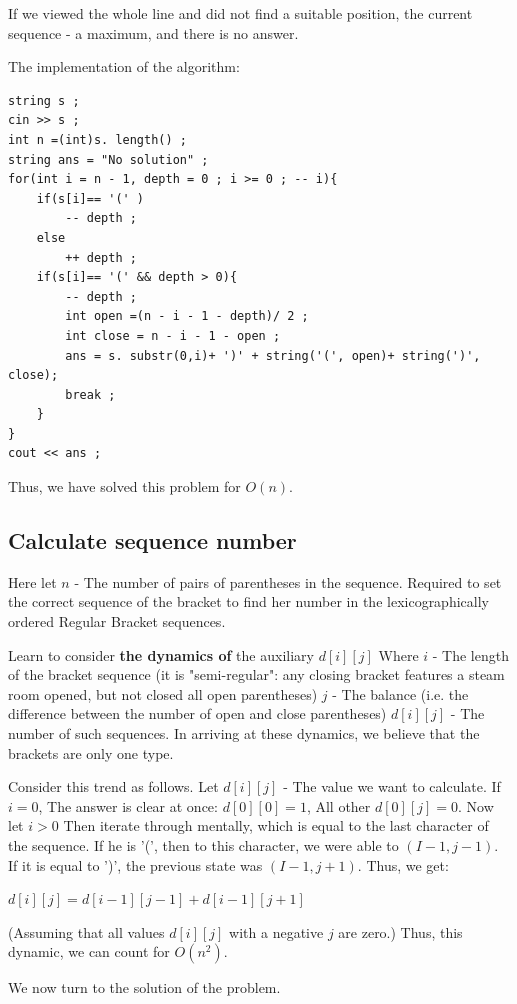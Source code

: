 If we viewed the whole line and did not find a suitable position, the current sequence - a maximum, and there is no answer.

The implementation of the algorithm:

\begin{verbatim}
string s ;
cin >> s ;
int n =(int)s. length() ;
string ans = "No solution" ;
for(int i = n - 1, depth = 0 ; i >= 0 ; -- i){
    if(s[i]== '(' )
        -- depth ;
    else
        ++ depth ;
    if(s[i]== '(' && depth > 0){
        -- depth ;
        int open =(n - i - 1 - depth)/ 2 ;
        int close = n - i - 1 - open ;
        ans = s. substr(0,i)+ ')' + string('(', open)+ string(')', close);
        break ;
    }
}
cout << ans ; 
\end{verbatim}
Thus, we have solved this problem for $O (n)$.

\subsection{ Calculate sequence number }

Here let $n$ - The number of pairs of parentheses in the sequence. Required to set the correct sequence of the bracket to find her number in the lexicographically ordered Regular Bracket sequences.

Learn to consider \textbf{the dynamics of} the auxiliary $d [i][j]$ Where $i$ - The length of the bracket sequence (it is "semi-regular": any closing bracket features a steam room opened, but not closed all open parentheses) $j$ - The balance (i.e. the difference between the number of open and close parentheses) $d [i][j]$ - The number of such sequences. In arriving at these dynamics, we believe that the brackets are only one type.

Consider this trend as follows. Let $d [i][j]$ - The value we want to calculate. If $i = 0$, The answer is clear at once: $d [0][0] = 1$, All other $d [0][j] = 0$. Now let $i> 0$ Then iterate through mentally, which is equal to the last character of the sequence. If he is '(', then to this character, we were able to $(I-1, j-1)$. If it is equal to ')', the previous state was $(I-1, j +1)$. Thus, we get:

$d [i][j] = d [i-1][j-1] + d [i-1][j +1]$

(Assuming that all values $d [i][j]$ with a negative $j$ are zero.) Thus, this dynamic, we can count for $O (n ^ 2)$.

We now turn to the solution of the problem.

